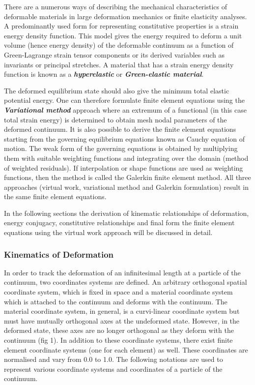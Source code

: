 There are a numerous ways of describing the mechanical characteristics of
deformable materials in large deformation mechanics or finite elasticity
analyses. A predominantly used form for representing constitutive properties
is a strain energy density function. This model gives the energy required to
deform a unit volume (hence energy density) of the deformable continuum as a
function of Green-Lagrange strain tensor components or its derived variables
such as invariants or principal stretches. A material that has a strain energy
density function is known as a \textit{\textbf{hyperelastic}} or
\textit{\textbf{Green-elastic material}}.

The deformed equilibrium state should also give the minimum total elastic
potential energy. One can therefore formulate finite element equations using
the \textit{\textbf{Variational method}} approach where an extremum of a
functional (in this case total strain energy) is determined to obtain mesh
nodal parameters of the deformed continuum. It is also possible to derive the
finite element equations starting from the governing equilibrium equations
known as Cauchy equation of motion. The weak form of the governing equations
is obtained by multiplying them with suitable weighting functions and
integrating over the domain (method of weighted residuals). If interpolation
or shape functions are used as weighting functions, then the method is called
the Galerkin finite element method. All three approaches (virtual work,
variational method and Galerkin formulation) result in the same finite element
equations.

In the following sections the derivation of kinematic relationships of
deformation, energy conjugacy, constitutive relationships and final form the
finite element equations using the virtual work approach will be discussed in
detail.

\subsubsection{Kinematics of Deformation}
In order to track the deformation of an infinitesimal length at a particle of
the continuum, two coordinates systems are defined. An arbitrary orthogonal
spatial coordinate system, which is fixed in space and a material coordinate
system which is attached to the continuum and deforms with the continuum. The
material coordinate system, in general, is a curvi-linear coordinate system
but must have mutually orthogonal axes at the undeformed state. However, in
the deformed state, these axes are no longer orthogonal as they deform with
the continuum (fig 1). In addition to these coordinate systems, there exist
finite element coordinate systems (one for each element) as well. These
coordinates are normalised and vary from 0.0 to 1.0. The following notations are used to represent various coordinate systems and coordinates of a particle of the continuum.\\

